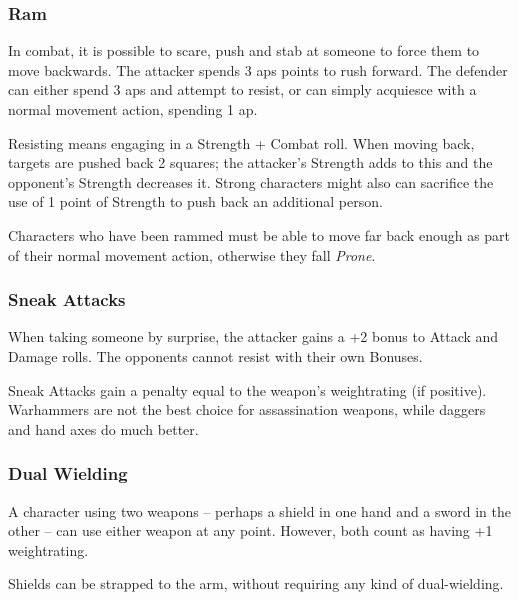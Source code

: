 \begin{multicols}{2}
\subsubsection[Ram: Push the enemy back 2 squares plus the difference between your Strength Bonuses. Resisting costs 2 \glspl{ap}, and requires a resisted Strength + Combat roll. Cost: 3 \glspl{ap}]{Ram}
\label{ram}

In combat, it is possible to scare, push and stab at someone to force them to move backwards.
The attacker spends 3 \glspl{ap} points to rush forward.
The defender can either spend 3 \glspl{ap} and attempt to resist, or can simply acquiesce with a normal movement action, spending 1 \gls{ap}.

Resisting means engaging in a Strength + Combat roll.
When moving back, targets are pushed back 2 squares; the attacker's Strength adds to this and the opponent's Strength decreases it.
Strong characters might also can sacrifice the use of 1 point of Strength to push back an additional person.

Characters who have been rammed must be able to move far back enough as part of their normal movement action, otherwise they fall \textit{Prone}.

\subsubsection[Sneak Attack: +2 to attack and +2 Damage. Surprised enemies cannot resist.]{Sneak Attacks}
\label{sneakattack}

When taking someone by surprise, the attacker gains a +2 bonus to Attack and Damage rolls.
The opponents cannot resist with their own Bonuses.

Sneak Attacks gain a penalty equal to the weapon's \gls{weightrating} (if positive).
Warhammers are not the best choice for assassination weapons, while daggers and hand axes do much better.

\subsubsection[Dual Wielding: Both weapons count has having +1 \glsentrytext{weightrating}]{Dual Wielding}

A character using two weapons -- perhaps a shield in one hand and a sword in the other -- can use either weapon at any point.
However, both count as having +1 \gls{weightrating}.

Shields can be strapped to the arm, without requiring any kind of dual-wielding.

\stopcontents[Manoeuvres]

\end{multicols}

